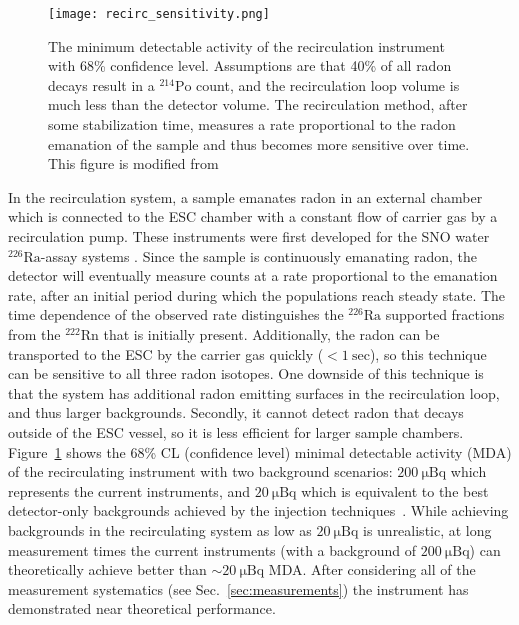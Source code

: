 \documentclass[final,3p,times]{elsarticle}
\begin{document}
\begin{figure}
    \centering
    \texttt{[image: recirc\_sensitivity.png]}
    \caption{The minimum detectable activity of the recirculation instrument with 68\% confidence level. Assumptions are that 40\% of all radon decays result in a $^{214}\text{Po}$ count, and the recirculation loop volume is much less than the detector volume. The recirculation method, after some stabilization time, measures a rate proportional to the radon emanation of the sample and thus becomes more sensitive over time. This figure is modified from \cite{brunner_thesis,Mamedov2011}}
    \label{fig:recirc_inject}
\end{figure}
In the recirculation system, a sample emanates radon in an external chamber which is connected to the ESC chamber with a constant flow of carrier gas by a recirculation pump.
These instruments were first developed for the SNO water $^{226}\text{Ra}$-assay systems \cite{SNO_ESC_NIM,Andersen2003,Farine2005}. 
Since the sample is continuously emanating radon, the detector will eventually measure counts at a rate proportional to the emanation rate, after an initial period during which the populations reach steady state.
The time dependence of the observed rate distinguishes the $^{226}\text{Ra}$ supported fractions from the $^{222}\text{Rn}$ that is initially present.
Additionally, the radon can be transported to the ESC by the carrier gas quickly ($< 1~\mathrm{sec}$), so this technique can be sensitive to all three radon isotopes. 
One downside of this technique is that the system has additional radon emitting surfaces in the recirculation loop, and thus larger backgrounds.
Secondly, it cannot detect radon that decays outside of the ESC vessel, so it is less efficient for larger sample chambers.
Figure~\ref{fig:recirc_inject} shows the 68\% CL (confidence level) minimal detectable activity (MDA) of the recirculating instrument with two background scenarios: $200~\mathrm{\mu Bq}$ which represents the current instruments, and $20~\mathrm{\mu Bq}$ which is equivalent to the best detector-only backgrounds achieved by the injection techniques~\cite{Zuzel2009,RnAssays_XENON1T}. 
While achieving backgrounds in the recirculating system as low as $20~\mathrm{\mu Bq}$ is unrealistic, at long measurement times the current instruments (with a background of $200~\mathrm{\mu Bq}$) can theoretically achieve better than $\sim 20~\mathrm{\mu Bq}$ MDA.
After considering all of the measurement systematics (see Sec.~\ref{sec:measurements}) the instrument has demonstrated near theoretical performance.
\end{document}
